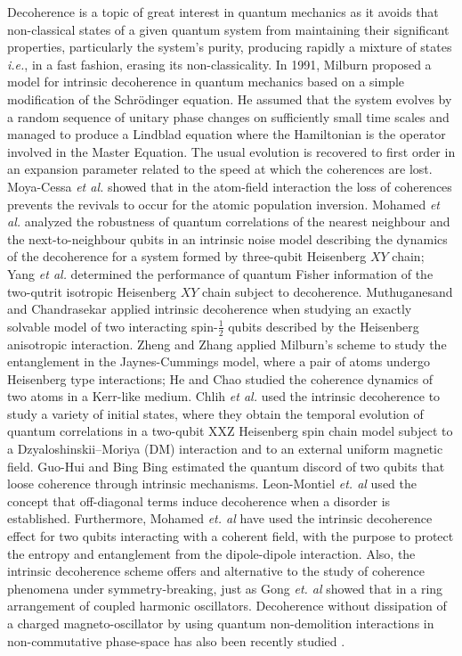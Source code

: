 \documentclass{article}
\begin{document}
Decoherence is a topic of great interest in quantum mechanics as it avoids that non-classical states of a given quantum system from  maintaining their significant properties, particularly the system's purity, producing rapidly a mixture of states {\it i.e.}, in a fast fashion, erasing its non-classicality. In 1991, Milburn \cite{Milburn1991} proposed a  model for intrinsic decoherence in quantum mechanics based on a simple modification of the Schr\"odinger equation. He assumed that the system evolves by a random sequence of unitary phase changes on sufficiently small time scales and managed to produce a Lindblad equation where the Hamiltonian is the operator involved in the Master Equation. The usual evolution is recovered to first order in an expansion parameter related to the speed at which the coherences are lost. Moya-Cessa {\it et al.} \cite{MoyaCessa1993} showed that in the atom-field interaction the loss of coherences prevents the revivals to occur for the atomic population inversion. Mohamed {\it et al.} \cite{Mohamed2021} analyzed the robustness of quantum correlations of the nearest neighbour and the next-to-neighbour qubits in an intrinsic noise model describing the dynamics of the decoherence for a system formed by three-qubit Heisenberg $XY$ chain; Yang {\it et al.} \cite{Yang2017} determined the performance of quantum Fisher information of the two-qutrit isotropic Heisenberg $XY$ chain subject to decoherence. Muthuganesand and Chandrasekar \cite{Muthuganesan2021} applied intrinsic decoherence when studying an exactly solvable model of two interacting spin-$\frac{1}{2}$ qubits described by the Heisenberg anisotropic interaction. Zheng and Zhang \cite{Zheng2017} applied Milburn's scheme to study the entanglement in the Jaynes-Cummings model, where a pair of atoms undergo  Heisenberg type interactions; He and Chao \cite{He2021} studied the coherence dynamics of two atoms in a Kerr-like medium. Chlih \textit{et al.} \cite{Chlih2021} used the intrinsic decoherence to study a variety of initial states, where they obtain the temporal evolution of quantum correlations in a two-qubit XXZ Heisenberg spin chain model subject to a Dzyaloshinskii–Moriya (DM) interaction and  to an external uniform magnetic field. Guo-Hui and Bing Bing \cite{GuoHui2015} estimated the quantum discord of two qubits that loose coherence through  intrinsic mechanisms. Leon-Montiel \textit{et. al} \cite{LenMontiel2015} used the concept that off-diagonal terms induce decoherence when a disorder is established. Furthermore, Mohamed \textit{et. al} \cite{Mohamed2020} have used the intrinsic decoherence effect for two qubits interacting with a coherent field, with the purpose to protect the entropy and entanglement from the dipole-dipole interaction. Also, the intrinsic decoherence scheme offers and alternative to the study of coherence phenomena under symmetry-breaking, just as Gong \textit{et. al} \cite{Gong2018} showed that in a ring arrangement of coupled harmonic oscillators.  Decoherence without dissipation of a charged magneto-oscillator by using quantum non-demolition interactions in non-commutative phase-space has also been recently studied \cite{Germain}. 
\end{document}
